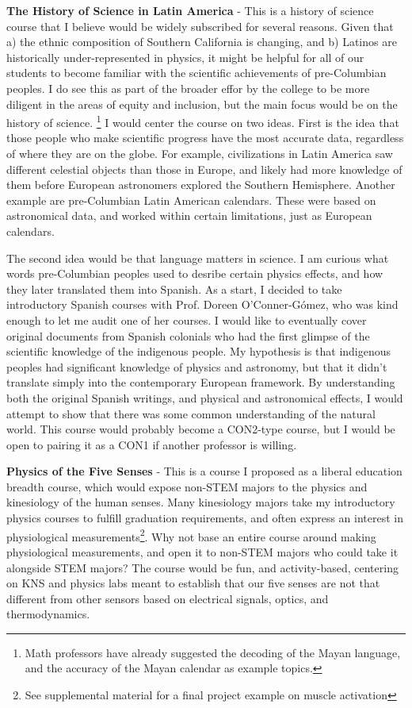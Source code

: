 \documentclass[../../main.tex]{subfiles}
\begin{document}
\textbf{The History of Science in Latin America} - This is a history of science course that I believe would be widely subscribed for several reasons.  Given that a) the ethnic composition of Southern California is changing, and b) Latinos are historically under-represented in physics, it might be helpful for all of our students to become familiar with the scientific achievements of pre-Columbian peoples.  I do see this as part of the broader effor by the college to be more diligent in the areas of equity and inclusion, but the main focus would be on the history of science.  \footnote{Math professors have already suggested the decoding of the Mayan language, and the accuracy of the Mayan calendar as example topics.}  I would center the course on two ideas. First is the idea that those people who make scientific progress have the most accurate data, regardless of where they are on the globe.  For example, civilizations in Latin America saw different celestial objects than those in Europe, and likely had more knowledge of them before European astronomers explored the Southern Hemisphere.  Another example are pre-Columbian Latin American calendars.  These were based on astronomical data, and worked within certain limitations, just as European calendars.  \\ \hspace{0.1cm}

The second idea would be that language matters in science.  I am curious what words pre-Columbian peoples used to desribe certain physics effects, and how they later translated them into Spanish.  As a start, I decided to take introductory Spanish courses with Prof. Doreen O'Conner-G\'{o}mez, who was kind enough to let me audit one of her courses.  I would like to eventually cover original documents from Spanish colonials who had the first glimpse of the scientific knowledge of the indigenous people.  My hypothesis is that indigenous peoples had significant knowledge of physics and astronomy, but that it didn't translate simply into the contemporary European framework.  By understanding both the original Spanish writings, and physical and astronomical effects, I would attempt to show that there was some common understanding of the natural world. This course would probably become a CON2-type course, but I would be open to pairing it as a CON1 if another professor is willing. \\ \hspace{0.1cm}

\textbf{Physics of the Five Senses} - This is a course I proposed as a liberal education breadth course, which would expose non-STEM majors to the physics and kinesiology of the human senses.  Many kinesiology majors take my introductory physics courses to fulfill graduation requirements, and often express an interest in physiological measurements\footnote{See supplemental material for a final project example on muscle activation}.  Why not base an entire course around making physiological measurements, and open it to non-STEM majors who could take it alongside STEM majors?  The course would be fun, and activity-based, centering on KNS and physics labs meant to establish that our five senses are not that different from other sensors based on electrical signals, optics, and thermodynamics.
\end{document}

